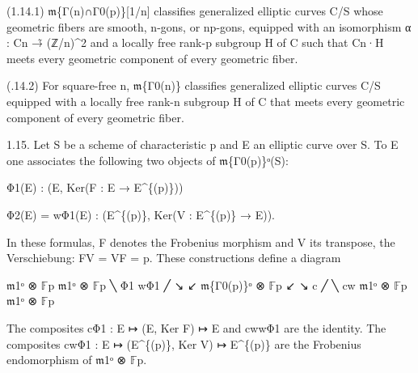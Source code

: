 \documentclass[11pt,a4paper]{article}
\begin{document}
(1.14.1) \ensuremath{\mathfrak{m}}\textunderscore{}\{Γ(n)∩Γ\textunderscore{}0(p)\}[1/n] classifies generalized elliptic curves C/S whose geometric fibers are smooth, n-gons, or np-gons, equipped with an isomorphism α : C\textunderscore{}n →̃ (ℤ/n)\textasciicircum{}2 and a locally free rank-p subgroup H of C such that C\textunderscore{}n·H meets every geometric component of every geometric fiber.

(.14.2) For square-free n, \ensuremath{\mathfrak{m}}\textunderscore{}\{Γ\textunderscore{}0(n)\} classifies generalized elliptic curves C/S equipped with a locally free rank-n subgroup H of C that meets every geometric component of every geometric fiber.

1.15. Let S be a scheme of characteristic p and E an elliptic curve over S. To E one associates the following two objects of \ensuremath{\mathfrak{m}}\textunderscore{}\{Γ\textunderscore{}0(p)\}ᵒ(S):

Φ\textunderscore{}1(E) : (E, Ker(F : E → E\textasciicircum{}\{(p)\}))

Φ\textunderscore{}2(E) = wΦ\textunderscore{}1(E) : (E\textasciicircum{}\{(p)\}, Ker(V : E\textasciicircum{}\{(p)\} → E)).

In these formulas, F denotes the Frobenius morphism and V its transpose, the Verschiebung: FV = VF = p. These constructions define a diagram

\ensuremath{\mathfrak{m}}\textunderscore{}1ᵒ ⊗ \ensuremath{\mathbb{F}}\textunderscore{}p                         \ensuremath{\mathfrak{m}}\textunderscore{}1ᵒ ⊗ \ensuremath{\mathbb{F}}\textunderscore{}p ╲ Φ\textunderscore{}1                   wΦ\textunderscore{}1 ╱ ↘                         ↙ \ensuremath{\mathfrak{m}}\textunderscore{}\{Γ\textunderscore{}0(p)\}ᵒ ⊗ \ensuremath{\mathbb{F}}\textunderscore{}p ↙                         ↘ c ╱                           ╲ cw \ensuremath{\mathfrak{m}}\textunderscore{}1ᵒ ⊗ \ensuremath{\mathbb{F}}\textunderscore{}p                         \ensuremath{\mathfrak{m}}\textunderscore{}1ᵒ ⊗ \ensuremath{\mathbb{F}}\textunderscore{}p

The composites cΦ\textunderscore{}1 : E ↦ (E, Ker F) ↦ E and cwwΦ\textunderscore{}1 are the identity. The composites cwΦ\textunderscore{}1 : E ↦ (E\textasciicircum{}\{(p)\}, Ker V) ↦ E\textasciicircum{}\{(p)\} are the Frobenius endomorphism of \ensuremath{\mathfrak{m}}\textunderscore{}1ᵒ ⊗ \ensuremath{\mathbb{F}}\textunderscore{}p.
\end{document}
